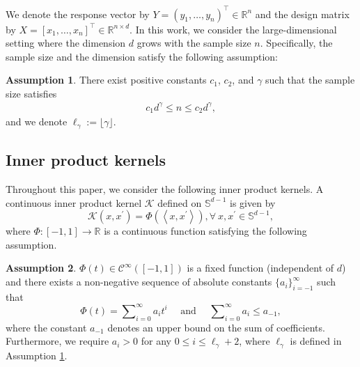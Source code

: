 \documentclass{article}
\theoremstyle{plain}
\theoremstyle{definition}
\newtheorem{assumption}{Assumption} %
\theoremstyle{remark}
\newcommand{\dhrev}[2]{{\color{cyan}[Old:]\textit{#1}} {\color{magenta}[New]#2}} %
\begin{document}
We denote the response vector by $Y=\left(y_1, \ldots, y_n\right)^{\top} \in \mathbb{R}^n$ and the design matrix by $X=\left[x_1, \ldots, x_n\right]^{\top} \in \mathbb{R}^{n \times d}$.
In this work, we consider the large-dimensional setting where the dimension $d$ grows with the sample size  $n$. 
Specifically, the sample size and the dimension satisfy the following assumption:

\begin{assumption}\label{assump_asymptotic}
    There exist positive constants $c_1$, $c_2$, and $\gamma$ such that the sample size satisfies
\begin{align}\label{Asym}
    c_{1} d^{\gamma} \leq n \leq c_{2} d^{\gamma},
\end{align}
and we denote $\ell_{\gamma} := \lfloor \gamma\rfloor$.
\end{assumption}







\subsection{Inner product kernels}\label{subsec_sphere_kernel}


Throughout this paper, we consider the following inner product kernels.
A continuous inner product kernel $\mathscr{K}$ defined on $\mathbb{S}^{d-1}$ is given by 
\begin{equation*}
    \mathscr{K}(x, x^\prime) = \Phi(\left\langle x, x^\prime \right\rangle), \forall~ x, x^\prime \in \mathbb{S}^{d-1},
\end{equation*}
where  $\Phi:[-1,1] \to \mathbb{R}$ is a continuous function satisfying the following assumption. 

\begin{assumption}\label{assu:coef_of_inner_prod_kernel} 
$\Phi(t) \in \mathcal{C}^{\infty} \left([-1,1]\right)$ is a fixed function (independent of $d$) and there exists a non-negative sequence of absolute constants $\{a_i\}_{i = -1}^{\infty}$ such that
    \begin{displaymath}
        \Phi(t) = \sum\nolimits_{i=0}^\infty a_i t^i
        \quad \text{ and } \quad 
        \sum\nolimits_{i=0}^\infty a_i \leq a_{-1}, 
    \end{displaymath}
    where the constant $a_{-1}$ denotes an upper bound on the sum of coefficients. 
    Furthermore, we require  
    $a_{i} > 0$ for any $0 \leq i \leq \ell_{\gamma} + 2$, where $\ell_{\gamma}$ is defined in Assumption \ref{assump_asymptotic}.
\end{assumption}
\end{document}
